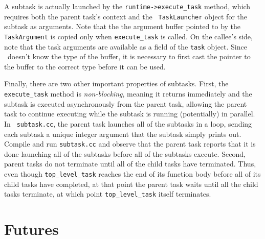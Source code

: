 A subtask is actually launched by the {\tt runtime->execute\_task}
method, which requires both the parent task's context and the {\tt
  TaskLauncher} object for the subtask as arguments.  Note that the
the argument buffer pointed to by the {\tt TaskArgument} is copied
only when {\tt execute\_task} is called. On the callee's side, note
that the task arguments are available as a field of the {\tt task}
object. Since \Cpp\ doesn't know the type of the buffer, it is
necessary to first cast the pointer to the buffer to the correct type
before it can be used.

Finally, there are two other important properties of subtasks.  First,
the {\tt execute\_task} method is {\em non-blocking}, meaning it
returns immediately and the subtask is executed asynchronously from
the parent task, allowing the parent task to continue executing while
the subtask is running (potentially) in parallel.  In {\tt
  subtask.cc}, the parent task launches all of the subtasks in a loop,
sending each subtask a unique integer argument that the subtask simply prints
out.  Compile and run {\tt subtask.cc} and observe that the
parent task reports that it is done launching all of the subtasks
before all of the subtasks execute.  Second, parent tasks do not
terminate until all of the child tasks have terminated.  Thus, even
though {\tt top\_level\_task} reaches the end of its function body
before all of its child tasks have completed, at that point the parent
task waits until all the child tasks terminate, at which point
{\tt top\_level\_task} itself terminates.

\section{Futures}
\label{sec:futures}

